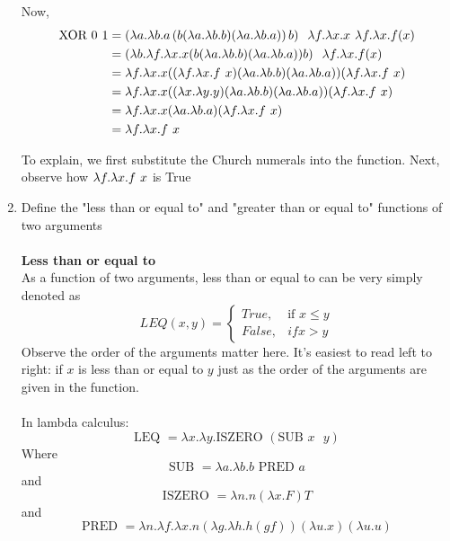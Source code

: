 \documentclass{article}
\begin{document}
\begin{enumerate}
    Now,
    \begin{align}
        \text{XOR } 0 \hspace{0.125cm} 1
        &=  (\lambda a.\lambda b.a \left(b (\lambda a.\lambda b.b) (\lambda a.\lambda b.a)\right) b) \hspace{0.25cm} \lambda f.\lambda x.x \hspace{0.125cm} \lambda f.\lambda x.f(x) \\
        &= (\lambda b.\lambda f.\lambda x.x (b (\lambda a.\lambda b.b) (\lambda a.\lambda b.a)) b) \hspace{0.25cm} \lambda f.\lambda x.f(x) \\
        &= \lambda f.\lambda x.x ((\lambda f.\lambda x.f \hspace{0.125cm} x) (\lambda a.\lambda b.b) (\lambda a.\lambda b.a)) (\lambda f.\lambda x.f \hspace{0.125cm} x) \\
        &= \lambda f.\lambda x.x ((\lambda x.\lambda y.y) (\lambda a.\lambda b.b) (\lambda a.\lambda b.a)) (\lambda f.\lambda x.f \hspace{0.125cm} x) \\
        &= \lambda f.\lambda x.x  (\lambda a.\lambda b.a) (\lambda f.\lambda x.f \hspace{0.125cm} x) \\
        &= \lambda f.\lambda x.f \hspace{0.125cm} x
    \end{align}
    
    To explain, we first substitute the Church numerals into the function. Next, observe how \(\lambda f.\lambda x.f \hspace{0.125cm} x\) is True
    
    \color{black}
    \newpage
    \item Define the "less than or equal to" and "greater than or equal to" functions of two arguments\\
    \\
    \color{blue}
    \Large \textbf{Less than or equal to}\\
    \normalsize
    As a function of two arguments, less than or equal to can be very simply denoted as
    \[LEQ(x,y) = \begin{cases} True, & \text{if } x\leq y \\ False, &{if } x > y\end{cases}\]
    Observe the order of the arguments matter here. It's easiest to read left to right: if \(x\) is less than or equal to \(y\) just as the order of the arguments are given in the function.\\
    \\
    In lambda calculus:
    \[\text{LEQ } = \lambda x.\lambda y.\text{ISZERO } (\text{SUB } x \text{ } y)\]
    Where
    \[\text{SUB } = \lambda a.\lambda b.b \text{ PRED } a\]
    and
    \[\text{ISZERO } = \lambda n.n (\lambda x.F) T\]
    and
    \[\text{PRED } = \lambda n. \lambda f. \lambda x. n (\lambda g. \lambda h. h (g f)) (\lambda u. x) (\lambda u. u)\]
    

\end{enumerate}
\end{document}
